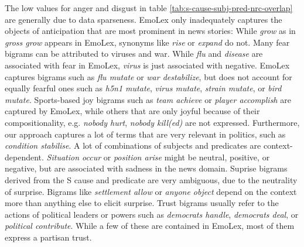 The low values for anger and disgust in table \ref{tab:s-cause-subj-pred-nrc-overlap} are generally due to data sparseness. EmoLex only inadequately captures the objects of anticipation that are most prominent in news stories: While \textit{grow} as in \textit{gross grow} appears in EmoLex, synonyms like \textit{rise} or \textit{expand} do not. Many fear bigrams can be attributed to viruses and war. While \textit{flu} and \textit{disease} are associated with fear in EmoLex, \textit{virus} is just associated with negative. EmoLex captures bigrams such as \textit{flu mutate} or \textit{war destabilize}, but does not account for equally fearful ones such as \textit{h5n1 mutate}, \textit{virus mutate}, \textit{strain mutate}, or \textit{bird mutate}.
Sports-based joy bigrams such as \textit{team achieve} or \textit{player accomplish} are captured by EmoLex, while others that are only joyful because of their compositionality, e.g. \textit{nobody hurt}, \textit{nobody kill(ed)} are not expressed. Furthermore, our approach captures a lot of terms that are very relevant in politics, such as \textit{condition stabilise}.
A lot of combinations of subjects and predicates are context-dependent. \textit{Situation occur} or \textit{position arise} might be neutral, positive, or negative, but are associated with sadness in the news domain.
Suprise bigrams derived from the S cause and predicate are very ambiguous, due to the neutrality of surprise. Bigrams like \textit{settlement allow} or \textit{anyone object} depend on the context more than anything else to elicit surprise.
Trust bigrams usually refer to the actions of political leaders or powers such as \textit{democrats handle}, \textit{democrats deal}, or \textit{political contribute}. While a few of these are contained in EmoLex, most of them express a partisan trust.

